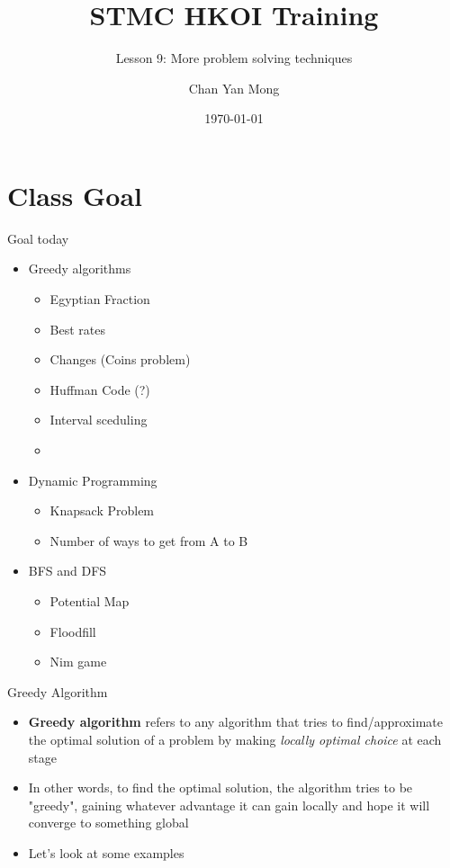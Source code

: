 \documentclass[10pt,xcolor={table,dvipsnames},t]{beamer}
\title[Your Short Title]{STMC HKOI Training}
\subtitle{Lesson 9: More problem solving techniques}
\author{Chan Yan Mong}
\date{\today}
\begin{document}
\begin{frame}
  \titlepage
\end{frame}


\section{Class Goal}

\begin{frame}{Goal today}
\begin{itemize}
  \item Greedy algorithms
  \begin{itemize}
    \item Egyptian Fraction
    \item Best rates 
    \item Changes (Coins problem)
    \item Huffman Code (?)
    \item Interval sceduling
    \item %
  \end{itemize}
  \item Dynamic Programming
  \begin{itemize}
    \item  Knapsack Problem
    \item Number of ways to get from A to B
  \end{itemize}
  \item BFS and DFS
  \begin{itemize}
    \item Potential Map 
    \item Floodfill
    \item Nim game
  \end{itemize}
\end{itemize}

\end{frame}


\begin{frame}[fragile]{Greedy Algorithm}
  \begin{itemize}
    \item \textbf{Greedy algorithm} refers to any algorithm that tries to find/approximate the optimal solution of a problem by making \textit{locally optimal choice} at each stage 
    \item In other words, to find the optimal solution, the algorithm tries to be "greedy", gaining whatever advantage it can gain locally and hope it will converge to something global
    \item Let's look at some examples
  \end{itemize}
\end{frame}
\end{document}

